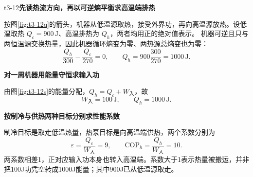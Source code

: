 \begin{drillsolution}{t3-12}\textbf{先读热流方向，再以可逆熵平衡求高温端排热}\par\nobreak
按图\ref{fig:t3-12q}的箭头，机器从低温源取热，接受外界功，再向高温源放热。设低温取热 $Q_c=900\,\mathrm J$、高温排热为 $Q_h$，两者均用正的绝对值表示。
机器可逆且只与两恒温源交换热量，因此机器循环熵变为零、两热源总熵变也为零：
\[\frac{Q_h}{300}-\frac{Q_c}{270}=0,
\qquad Q_h=900\frac{300}{270}=1000\,\mathrm J.\]



\par\medskip{}\noindent\textbf{对一周机器用能量守恒求输入功}\par\nobreak
由图\ref{fig:t3-12s}的能量分配，$Q_h=Q_c+W_{\text{入}}$，故
\[\boxed{W_{\text{入}}=100\,\mathrm J,\qquad Q_h=1000\,\mathrm J}.\]


\par\medskip{}\noindent\textbf{按制冷与供热两种目标分别求性能系数}\par\nobreak
制冷目标是取走低温热量，热泵目标是向高温端供热，两个系数分别为
\[\boxed{\varepsilon=\frac{Q_c}{W_{\text{入}}}=9,\qquad \mathrm{COP}_h=\frac{Q_h}{W_{\text{入}}}=10}.\]
两系数相差1，正对应输入功本身也转入高温端。系数大于1表示热量被搬运，并非把100J功凭空转成1000J能量；其中900J已从低温源取走。
\end{drillsolution}
